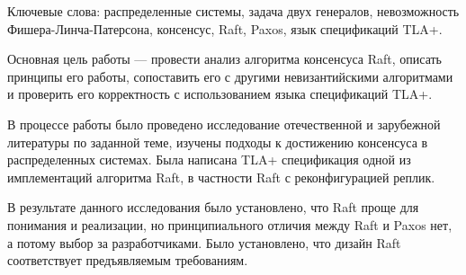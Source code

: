 \abstract %

Ключевые слова: распределенные системы, задача двух генералов, невозможность
Фишера-Линча-Патерсона, консенсус, Raft, Paxos, язык спецификаций TLA+.

Основная цель работы — провести анализ алгоритма консенсуса Raft, описать
принципы его работы, сопоставить его с другими невизантийскими алгоритмами и
проверить его корректность с использованием языка спецификаций TLA+.

В процессе работы было проведено исследование отечественной и зарубежной
литературы по заданной теме, изучены подходы к достижению консенсуса в
распределенных системах. Была написана TLA+ спецификация одной из имплементаций
алгоритма Raft, в частности Raft с реконфигурацией реплик.

В результате данного исследования было установлено, что Raft проще для понимания
и реализации, но принципиального отличия между Raft и Paxos нет, а потому выбор
за разработчиками. Было установлено, что дизайн Raft соответствует предъявляемым
требованиям.
